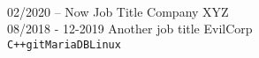 \documentclass[9pt]{developercv} %
\begin{document}
\vspace{0.5cm} %



\begin{minipage}[t]{0.4\textwidth} %
	\vspace{-\baselineskip} %
	\lorem\lorem\lorem\lorem
	\\ %
\end{minipage}
\hfill %
\begin{minipage}[t]{0.5\textwidth} %
	\vspace{-\baselineskip} %

	\begin{barchart}{5.5} %
	\end{barchart}
\end{minipage}




\begin{entrylist}
	\entry
		{02/2020 -- Now}
		{Job Title}
		{Company XYZ}
		{\lorem\lorem}\\
	\entry
		{08/2018 - 12-2019}
		{Another job title}
		{EvilCorp}
		{\lorem\lorem\\
		\texttt{C++}\slashsep\texttt{git}\slashsep\texttt{MariaDB}\slashsep\texttt{Linux}}
%
%
\end{entrylist}
\end{document}
